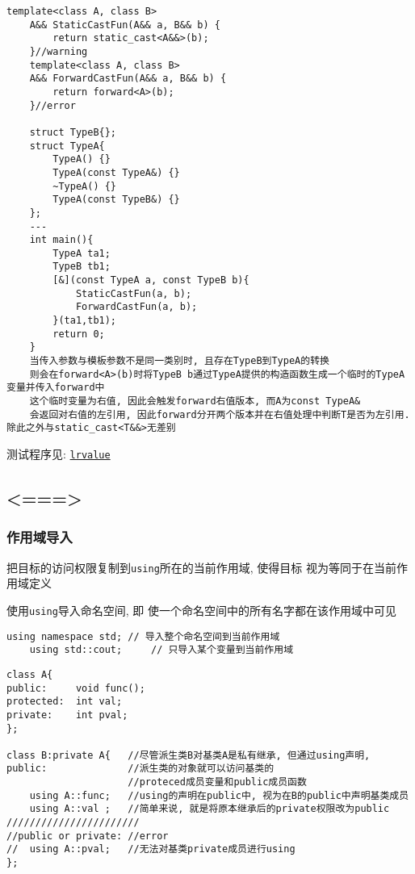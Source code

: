 \begin{lstlisting}[xleftmargin=2em,xrightmargin=2em,title=特殊情况]
	template<class A, class B>
	A&& StaticCastFun(A&& a, B&& b) {
		return static_cast<A&&>(b);
	}//warning
	template<class A, class B>
	A&& ForwardCastFun(A&& a, B&& b) {
		return forward<A>(b);
	}//error

	struct TypeB{};
	struct TypeA{
		TypeA() {}
		TypeA(const TypeA&) {}
		~TypeA() {}
		TypeA(const TypeB&) {}
	};
	---
	int main(){
		TypeA ta1;
		TypeB tb1;
		[&](const TypeA a, const TypeB b){
			StaticCastFun(a, b);
			ForwardCastFun(a, b);
		}(ta1,tb1);
		return 0;
	}
	当传入参数与模板参数不是同一类别时, 且存在TypeB到TypeA的转换
	则会在forward<A>(b)时将TypeB b通过TypeA提供的构造函数生成一个临时的TypeA变量并传入forward中
	这个临时变量为右值, 因此会触发forward右值版本, 而A为const TypeA&
	会返回对右值的左引用, 因此forward分开两个版本并在右值处理中判断T是否为左引用. 除此之外与static_cast<T&&>无差别

\end{lstlisting}
测试程序见: \href{https://github.com/wenqingqian/Obtuse/blob/main/test/cpp/c++11/lrvalue.cpp}{\tt lrvalue}
\subsection{<===>\color{purple}{\tt using}}
\subsubsection{作用域导入}
把目标的访问权限复制到{\tt using}所在的当前作用域, 
	使得目标 视为等同于在当前作用域定义

使用{\tt using}导入命名空间, 即 使一个命名空间中的所有名字都在该作用域中可见
\begin{lstlisting}[xleftmargin=5em,xrightmargin=5em]
	using namespace std; // 导入整个命名空间到当前作用域
	using std::cout;     // 只导入某个变量到当前作用域 
\end{lstlisting}


\begin{lstlisting}[title=在派生类中引用基类成员]
class A{
public:		void func();
protected:	int val;
private:	int pval;
};

class B:private A{   //尽管派生类B对基类A是私有继承, 但通过using声明,
public:			     //派生类的对象就可以访问基类的
					 //proteced成员变量和public成员函数
	using A::func;   //using的声明在public中, 视为在B的public中声明基类成员
	using A::val ;   //简单来说, 就是将原本继承后的private权限改为public
///////////////////////	
//public or private: //error	
//	using A::pval;   //无法对基类private成员进行using
};
\end{lstlisting}
